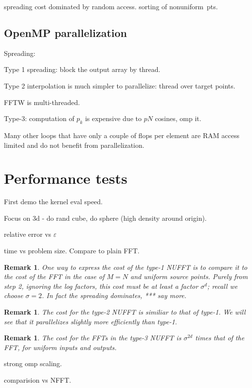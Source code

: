\documentclass[10pt]{article}
\newcommand{\eps}{\varepsilon}
\newtheorem{rmk}[thm]{Remark}
\newcommand{\rat}{\sigma}          %
\newcommand{\NU}{{nonuniform}}       %
\begin{document}
spreading cost dominated by random access.
sorting of \NU\ pts.

\subsection{OpenMP parallelization}

Spreading:

Type 1 spreading:
block the output array by thread.

Type 2 interpolation is much simpler to parallelize:
thread over target points.

FFTW is multi-threaded.

Type-3:
computation of $p_k$ is expensive due to $pN$ cosines,
omp it.

Many other loops that have only a couple of flops
per element are RAM access limited and do not benefit
from parallelization.


\section{Performance tests}

First demo the kernel eval speed.

Focus on 3d - do rand cube, do sphere (high density around origin).



relative error vs $\eps$

time vs problem size.
Compare to plain FFT.

\begin{rmk}
  One way to express the cost of the type-1 NUFFT
  is to compare it to the cost of the FFT in the case of $M=N$
  and uniform source points.
  Purely from step 2, ignoring the log factors,
  this cost must be at least a factor $\rat^d$; recall we choose $\rat=2$.
  In fact the spreading dominates,
  *** say more.
\end{rmk}
\begin{rmk}
  The cost for the type-2 NUFFT is similiar to that of type-1.
  We will see that it parallelizes slightly more efficiently
  than type-1.
\end{rmk}
\begin{rmk}
  The cost for the FFTs in the type-3 NUFFT is $\rat^{2d}$ times that of
  the FFT, for uniform inputs and outputs.
\end{rmk}




strong omp scaling.

comparision vs NFFT.
\end{document}
